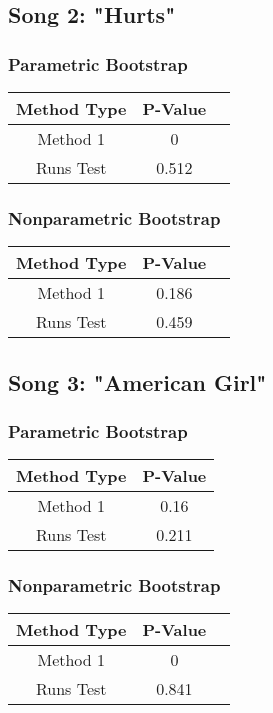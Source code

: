 \documentclass[12pt, letterpaper]{article}
\begin{document}
\subsection{Song 2: "Hurts"}

\subsubsection{Parametric Bootstrap}
\begin{tabular}{|c|c|c|}
\hline
\textbf{Method Type} & P-Value \\
\hline
Method 1 & 0  \\
\hline
Runs Test & 0.512 \\ 
\hline
\end{tabular}

\subsubsection{Nonparametric Bootstrap}
\begin{tabular}{|c|c|c|}
\hline
\textbf{Method Type} & P-Value \\
\hline
Method 1 & 0.186  \\
\hline
Runs Test & 0.459 \\ 
\hline
\end{tabular}

\subsection{Song 3: "American Girl"}
\subsubsection{Parametric Bootstrap}

\begin{tabular}{|c|c|}
\hline
\textbf{Method Type} & P-Value \\
\hline
Method 1 & 0.16 \\
\hline
Runs Test & 0.211 \\ 
\hline 
\end{tabular}

\subsubsection{Nonparametric Bootstrap}
\begin{tabular}{|c|c|c|}
\hline
\textbf{Method Type} & P-Value \\
\hline
Method 1 & 0  \\
\hline
Runs Test & 0.841 \\ 
\hline
\end{tabular}
\end{document}
